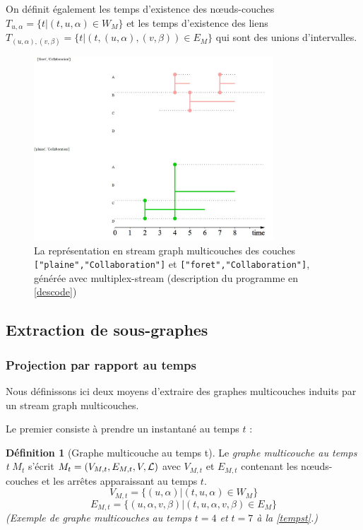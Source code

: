 \documentclass[11pt,a4paper]{article}
\theoremstyle{definition}
\newtheorem{defn}{Définition}
\theoremstyle{remark}
\theoremstyle{remark}
\def \stgm {stream graph multicouches}
\begin{document}
    
    
    On définit également les temps d'existence des n\oe{}uds-couches $T_{u,\alpha}=\{t| (t,u,\alpha) \in W_M \}$ et les temps d'existence des liens $T_{(u,\alpha),(v,\beta)}=\{t| (t,(u,\alpha),(v,\beta)) \in E_M \} $ qui sont des unions d'intervalles.

	
	\begin{figure}[H]
		\centering
		\includegraphics[width=0.8\textwidth]{exMultiStream.JPG}
		\caption{La représentation en \stgm{} des couches \texttt{["plaine","Collaboration"]} et \texttt{["foret","Collaboration"]}, générée avec \og multiplex-stream \fg{} (description du programme en \cref{descode})}
		\label{exstgm}
	\end{figure}
	

\subsection{Extraction de sous-graphes}
\label{sousgraphes}
\subsubsection{Projection par rapport au temps}
	Nous définissons ici deux moyens d'extraire des graphes multicouches induits par un \stgm{}.
	
	Le premier consiste à prendre un instantané au temps $t$ :
	\begin{defn}[Graphe multicouche au temps t]
   	Le {\em graphe multicouche au temps t} $M_t$ s'écrit $M_t = (V_{M,t}, E_{M,t},V,{\cal L})$ avec $V_{M,t}$ et $E_{M,t}$ contenant les n\oe{}uds-couches et les arrêtes apparaissant au temps $t$.
   	$$ V_{M,t} = \{ (u,\alpha) | (t,u,\alpha) \in W_M\} $$
   	$$ E_{M,t} = \{(u,\alpha,v,\beta) | (t,u,\alpha,v,\beta) \in E_M\}$$
    \textit{(Exemple de graphe multicouches au temps $t=4$ et $t=7$ à la \cref{tempst}.)}
   \end{defn}
\end{document}
